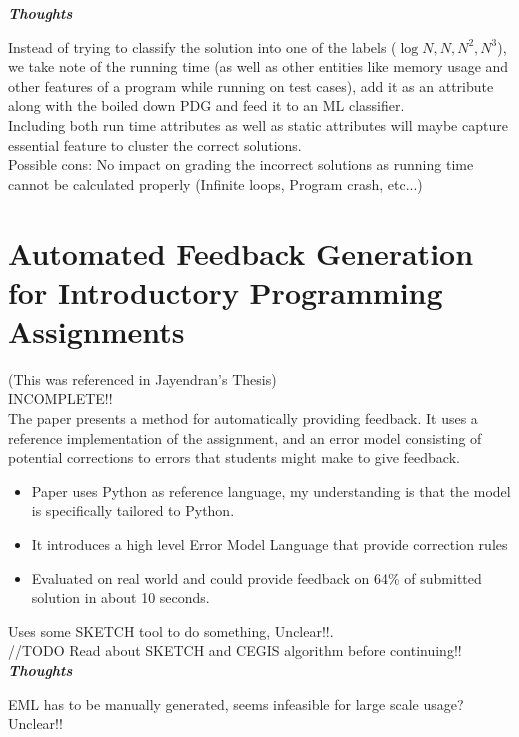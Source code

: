 \documentclass{article}
\begin{document}
\textbf{\textit{Thoughts}}

Instead of trying to classify the solution into one of the labels ($\log N,N,N^2,N^3$), we take note of the running time (as well as other entities like memory usage and other features of a program while running on test cases), add it as an attribute along with the boiled down PDG and feed it to an ML classifier.\\

Including both run time attributes as well as static attributes will maybe capture essential feature to cluster the correct solutions.\\

Possible cons: No impact on grading the incorrect solutions as running time cannot be calculated properly (Infinite loops, Program crash, etc...)
 
\section{Automated Feedback Generation for
Introductory Programming Assignments \cite{singh2013automated}}
(This was referenced in Jayendran's Thesis)\\

INCOMPLETE!!\\


The paper presents a method for automatically providing feedback. It uses a reference implementation of the assignment, and an error model consisting of potential corrections to errors that students might make to give feedback.\\

\begin{itemize}
    \item Paper uses Python as reference language, my understanding is that the model is specifically tailored to Python.

    \item It introduces a high level Error Model Language that provide correction rules

    \item Evaluated on real world and could provide feedback on 64\% of submitted solution in about 10 seconds. 
\end{itemize}


Uses some SKETCH tool to do something, Unclear!!.\\ 

//TODO Read about SKETCH and CEGIS algorithm before continuing!!\\


\textbf{\textit{Thoughts}}

EML has to be manually generated, seems infeasible for large scale usage? Unclear!!







\printbibliography
\end{document}
